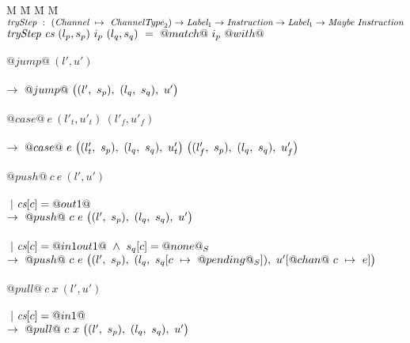 

\begin{figure}
\begin{tabbing}
M \= M \= M \= M \kill
$\ti{tryStep} ~:~ \ChanTypeMap \to \Label_1 \to \Instr \to \Label_1 \to \Maybe~\Instr$ \\
$\ti{tryStep} ~\cs~(l_p,s_p)~i_p~(l_q,s_q)~=~@match@~i_p~@with@$ \\

\\
\> $@jump@~(l',u')$ \\
\> \>  \\
\> \> $\to~@jump@~
      \nextStep
        {l'}{s_p}
        {l_q}{s_q}
        {u'}
      $ \\

\\


\> $@case@~e~(l'_t,u'_t)~(l'_f,u'_f)$ \\
\> \>  \\
\> \> $\to~@case@~e~
      \nextStep
        {l'_t}{s_p}
        {l_q}{s_q}
        {u'_t}
      ~
      \nextStep
        {l'_f}{s_p}
        {l_q}{s_q}
        {u'_f}
      $ \\

\\

\> $@push@~c~e~(l',u')$ \\
\> \> \\
\> \> $~|~\cs[c]=@out1@$ \\
\> \> $\to~@push@~c~e~
      \nextStep
        {l'}
          {s_p}
        {l_q}
          {s_q}
        {u'}
      $ \\

\> \> \\
\> \> $~|~\cs[c]=@in1out1@ ~\wedge~ s_q[c]=@none@_S$ \\
\> \> $\to~@push@~c~e~
      \nextStep
        {l'}
          {s_p}
        {l_q}
          {\HeapUpdateOne{c}{@pending@_S}{s_q}}
        {\HeapUpdateOne{@chan@~c}{e}{u'}}
      $ \\

\\

\> $@pull@~c~x~(l',u')$ \\
\> \> \\
\> \> $~|~\cs[c]=@in1@$ \\
\> \> $\to~@pull@~c~x~
      \nextStep
        {l'}{s_p}
        {l_q}{s_q}
        {u'}
    $ \\


\end{tabbing}
\end{figure}
